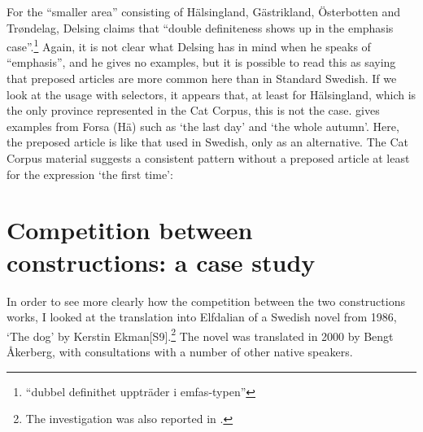 For the “smaller area” consisting of Hälsingland, Gästrikland, Österbotten and Trøndelag, Delsing claims that “double definiteness shows up in the emphasis case”.\footnote{ “dubbel definithet uppträder i emfas-typen” } Again, it is not clear what Delsing has in mind when he speaks of “emphasis”, and he gives no examples, but it is possible to read this as saying that preposed articles are more common here than in Standard Swedish. If we look at the usage with selectors, it appears that, at least for Hälsingland, which is the only province represented in the Cat Corpus, this is not the case. \citet[31]{Franck1995} gives examples from Forsa (Hä) such as  ‘the last day’ and  ‘the whole autumn’.  Here, the preposed article is like that used in Swedish, only as an alternative. The Cat Corpus material suggests a consistent pattern without a preposed article at least for the expression ‘the first time’:

\ea\label{}
\z
\z 
\section{Competition between constructions: a case study}

In order to see more clearly how the competition between the two constructions works, I looked at the translation into Elfdalian of a Swedish novel from 1986,  ‘The dog’ by Kerstin Ekman[S9].\footnote{ The investigation was also reported in \citet{Dahl2004}.} The novel was translated in 2000 by Bengt Åkerberg, with consultations with a number of other native speakers. 


